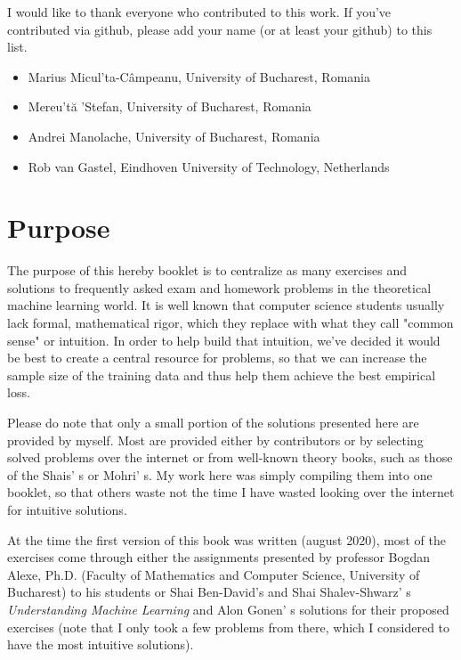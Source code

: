 \documentclass{article}
\newcommand{\<}{\langle}
\renewcommand{\>}{\rangle}
\theoremstyle{definition}
\begin{document}
I would like to thank everyone who contributed to this work. If you've contributed via github, please add your name (or at least your github) to this list.

\begin{itemize}
    \item[] Marius Micul'ta-C\^{a}mpeanu, University of Bucharest, Romania
    \item[] Mereu't\u{a} 'Stefan, University of Bucharest, Romania
    \item[] Andrei Manolache, University of Bucharest, Romania
    \item[] Rob van Gastel,  Eindhoven University of Technology, Netherlands
\end{itemize}

\newpage

\section*{Purpose}

The purpose of this hereby booklet is to centralize as many exercises and solutions to frequently asked exam and homework problems in the theoretical machine learning world. 
It is well known that computer science students usually lack formal, mathematical rigor, which they replace with what they call "common sense" or intuition. In order to help build that intuition, we've decided it would be best to create a central resource for problems, so that we can increase the sample size of the training data and thus help them achieve the best empirical loss.

Please do note that only a small portion of the solutions presented here are provided by myself. Most are provided either by contributors or by selecting solved problems over the internet or from well-known theory books, such as those of the Shais' s or Mohri' s. My work here was simply compiling them into one booklet, so that others waste not the time I have wasted looking over the internet for intuitive solutions.

At the time the first version of this book was written (august 2020), most of the exercises come through either the assignments presented by professor Bogdan Alexe, Ph.D. (Faculty of Mathematics and Computer Science, University of Bucharest) to his students or Shai Ben-David's and Shai Shalev-Shwarz' s \textit{Understanding Machine Learning} and Alon Gonen' s solutions for their proposed exercises (note that I only took a few problems from there, which I considered to have the most intuitive solutions).
\end{document}
